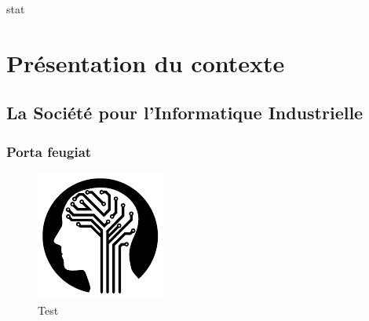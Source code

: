  stat\chapter{Présentation du contexte}

	\section{La Société pour l'Informatique Industrielle}

		\subsection{Porta feugiat}
		
			\lipsum[2]
			
			\begin{figure}[h]
				\centering
				\includegraphics[page=1,width=.3\textwidth]{figures/test.pdf}
				\caption{Test}
				\label{fig:Test}
			\end{figure}
			
			\lipsum[3]

